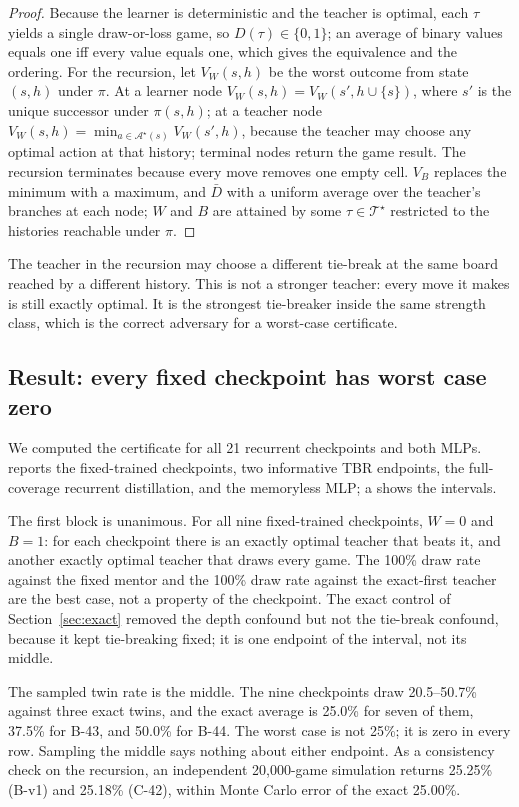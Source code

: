 \documentclass[conference]{IEEEtran}
\begin{document}
\begin{proof}
Because the learner is deterministic and the teacher is optimal, each $\tau$ yields a single draw-or-loss game, so $D(\tau)\in\{0,1\}$; an average of binary values equals one iff every value equals one, which gives the equivalence and the ordering. For the recursion, let $V_W(s,h)$ be the worst outcome from state $(s,h)$ under $\pi$. At a learner node $V_W(s,h)=V_W(s',h\cup\{s\})$, where $s'$ is the unique successor under $\pi(s,h)$; at a teacher node $V_W(s,h)=\min_{a\in\mathcal{A}^{\star}(s)}V_W(s',h)$, because the teacher may choose any optimal action at that history; terminal nodes return the game result. The recursion terminates because every move removes one empty cell. $V_B$ replaces the minimum with a maximum, and $\bar D$ with a uniform average over the teacher's branches at each node; $W$ and $B$ are attained by some $\tau\in\mathcal{T}^{\star}$ restricted to the histories reachable under $\pi$.
\end{proof}

The teacher in the recursion may choose a different tie-break at the same board reached by a different history. This is not a stronger teacher: every move it makes is still exactly optimal. It is the strongest tie-breaker inside the same strength class, which is the correct adversary for a worst-case certificate.

\subsection{Result: every fixed checkpoint has worst case zero}
We computed the certificate for all 21 recurrent checkpoints and both MLPs.  reports the fixed-trained checkpoints, two informative TBR endpoints, the full-coverage recurrent distillation, and the memoryless MLP; a shows the intervals.

The first block is unanimous. For all nine fixed-trained checkpoints, $W=0$ and $B=1$: for each checkpoint there is an exactly optimal teacher that beats it, and another exactly optimal teacher that draws every game. The 100\% draw rate against the fixed mentor and the 100\% draw rate against the exact-first teacher are the best case, not a property of the checkpoint. The exact control of Section~\ref{sec:exact} removed the depth confound but not the tie-break confound, because it kept tie-breaking fixed; it is one endpoint of the interval, not its middle.

The sampled twin rate is the middle. The nine checkpoints draw 20.5--50.7\% against three exact twins, and the exact average is 25.0\% for seven of them, 37.5\% for B-43, and 50.0\% for B-44. The worst case is not 25\%; it is zero in every row. Sampling the middle says nothing about either endpoint. As a consistency check on the recursion, an independent 20{,}000-game simulation returns 25.25\% (B-v1) and 25.18\% (C-42), within Monte Carlo error of the exact 25.00\%.
\end{document}
